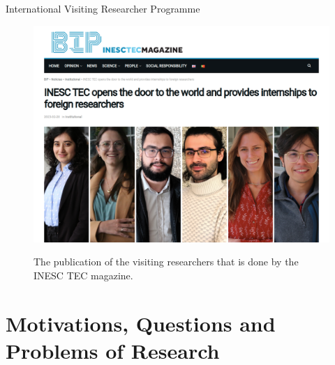\documentclass[newPxFont,numfooter,sectionpages]{beamer}
\begin{document}
\begin{frame}[c]{International Visiting Researcher Programme}
	



\begin{figure}
    \centering
    \caption{The publication of the visiting researchers that is done by the INESC TEC magazine.}
    \includegraphics[width=\textwidth]{images/bip-inesctec-pt.png}
    \label{fig:my_label}
\end{figure}

\end{frame}



\section{Motivations, Questions and Problems of Research}
\end{document}
